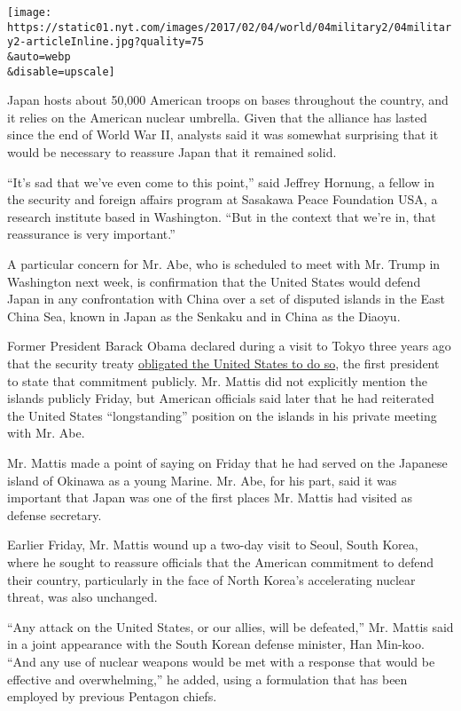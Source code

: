 \texttt{[image: https://static01.nyt.com/images/2017/02/04/world/04military2/04military2-articleInline.jpg?quality=75\\\&auto=webp\\\&disable=upscale]}

Japan hosts about 50,000 American troops on bases throughout the
country, and it relies on the American nuclear umbrella. Given that the
alliance has lasted since the end of World War II, analysts said it was
somewhat surprising that it would be necessary to reassure Japan that it
remained solid.

``It's sad that we've even come to this point,'' said Jeffrey Hornung, a
fellow in the security and foreign affairs program at Sasakawa Peace
Foundation USA, a research institute based in Washington. ``But in the
context that we're in, that reassurance is very important.''

A particular concern for Mr. Abe, who is scheduled to meet with Mr.
Trump in Washington next week, is confirmation that the United States
would defend Japan in any confrontation with China over a set of
disputed islands in the East China Sea, known in Japan as the Senkaku
and in China as the Diaoyu.

Former President Barack Obama declared during a visit to Tokyo three
years ago that the security treaty
\href{https://www.nytimes.com/2014/04/25/world/asia/obama-asia.html}{obligated
the United States to do so}, the first president to state that
commitment publicly. Mr. Mattis did not explicitly mention the islands
publicly Friday, but American officials said later that he had
reiterated the United States ``longstanding'' position on the islands in
his private meeting with Mr. Abe.

Mr. Mattis made a point of saying on Friday that he had served on the
Japanese island of Okinawa as a young Marine. Mr. Abe, for his part,
said it was important that Japan was one of the first places Mr. Mattis
had visited as defense secretary.

Earlier Friday, Mr. Mattis wound up a two-day visit to Seoul, South
Korea, where he sought to reassure officials that the American
commitment to defend their country, particularly in the face of North
Korea's accelerating nuclear threat, was also unchanged.

``Any attack on the United States, or our allies, will be defeated,''
Mr. Mattis said in a joint appearance with the South Korean defense
minister, Han Min-koo. ``And any use of nuclear weapons would be met
with a response that would be effective and overwhelming,'' he added,
using a formulation that has been employed by previous Pentagon chiefs.


